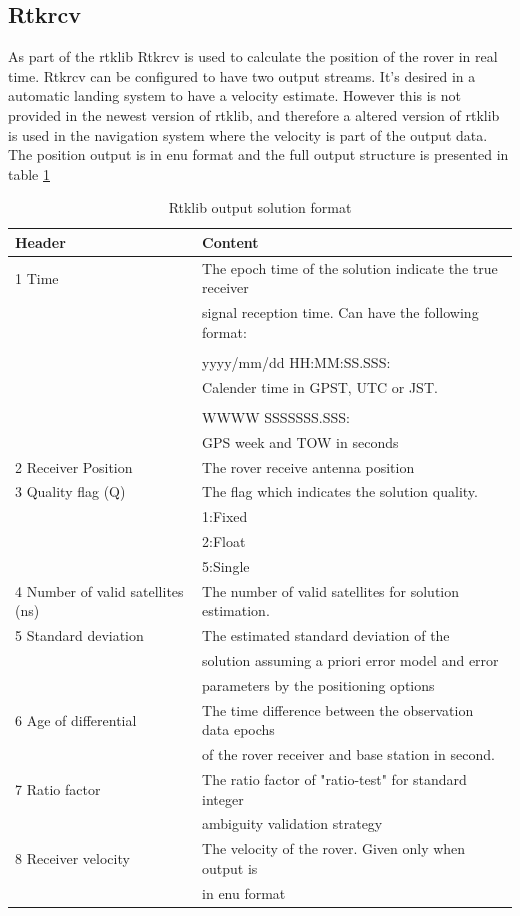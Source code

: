 \subsection{Rtkrcv}
As part of the \gls{rtklib} Rtkrcv is  used to calculate the position of the rover in real time. Rtkrcv can be configured to have two output streams. It's desired in a automatic landing system to have a velocity estimate. However this is not provided in the newest version of \gls{rtklib}, and therefore a altered version of \gls{rtklib} is used in the navigation system where the velocity is part of the output data. The position output is in \gls{enu} format and the full output structure is presented in table \ref{Tb:RtklibOutput}
\begin{table}[H]
\begin{center}
    \begin{tabular}{ | l | l |}
    \hline
    \textbf{Header} & \textbf{Content} \\ \hline
     1 Time & The epoch time of the solution indicate the true receiver\\& signal reception time. Can have the following format:\\&\\& yyyy/mm/dd HH:MM:SS.SSS:\\& Calender time in GPST, UTC or JST.\\&\\&
     
     WWWW SSSSSSS.SSS:\\&
     GPS week and TOW in seconds  \\ \hline
     2 Receiver Position & The rover receive antenna position \\ \hline
     3 Quality flag (Q) & The flag which indicates the solution quality.\\& 1:Fixed\\& 2:Float\\& 5:Single \\ \hline
     4 Number of valid satellites (ns) & The number of valid satellites for solution estimation. \\ \hline
     5 Standard deviation & The estimated standard deviation of the\\& solution assuming a priori error model and error\\& parameters by the positioning options \\ \hline
     6 Age of differential & The time difference between the observation data epochs\\& of the rover receiver and base station in second. \\ \hline
     7 Ratio factor & The ratio factor of "ratio-test" for standard integer\\& ambiguity validation strategy \\ \hline
     8 Receiver velocity & The velocity of the rover. Given only when output is\\& in enu format \\ \hline
    \end{tabular}
\end{center}
\caption{Rtklib output solution format }
\label{Tb:RtklibOutput}
\end{table}

